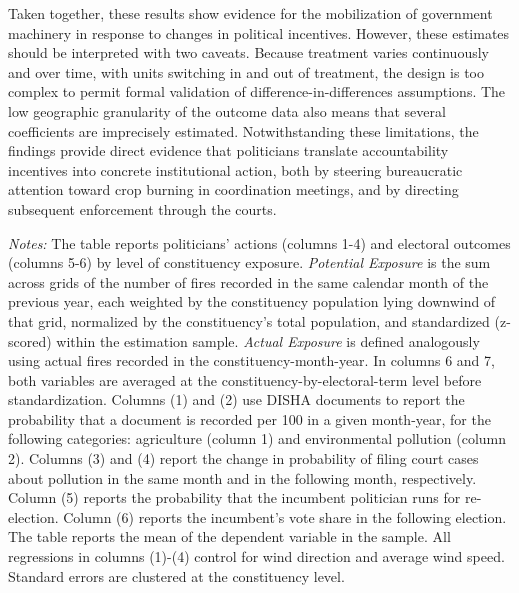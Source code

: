 \documentclass[12pt]{article}
\let\SourceInput
\renewcommand{}[1]{%
  \IfFileExists{../../#1}{\SourceInput{../../#1}}{%
    \IfFileExists{../../#1.tex}{\SourceInput{../../#1.tex}}{%
      \fbox{\scriptsize Missing table: \detokenize{#1}}}}}
\begin{document}
Taken together, these results show evidence for the mobilization of government machinery in response to changes in political incentives. However, these estimates should be interpreted with two caveats. Because treatment varies continuously and over time, with units switching in and out of treatment, the design is too complex to permit formal validation of difference-in-differences assumptions. The low geographic granularity of the outcome data also means that several coefficients are imprecisely estimated. Notwithstanding these limitations, the findings provide direct evidence that politicians translate accountability incentives into concrete institutional action, both by steering bureaucratic attention toward crop burning in coordination meetings, and by directing subsequent enforcement through the courts.


\begin{table}[htbp!] 
\caption{Pollution Exposure, Politicians' Actions, and Electoral Consequences, Count $\times$ Downwind Pop}\label{tab:mechanism}
        \resizebox{\linewidth}{!}{
        
        }
    \begin{minipage}{\textwidth}
        {\footnotesize \textit{Notes:} The table reports politicians' actions (columns 1-4) and electoral outcomes (columns 5-6) by level of constituency exposure.
        \textit{Potential Exposure} is the sum across grids of the number of fires  recorded in the same calendar month of the previous year, each weighted by the  constituency population lying downwind of that grid, normalized by the  constituency's total population, and standardized (z-scored) within the  estimation sample.
       \textit{Actual Exposure} is defined analogously using actual fires recorded in the   constituency-month-year. In columns 6 and 7, both variables are averaged at  the constituency-by-electoral-term level before standardization.
        Columns (1) and (2) use DISHA documents to report the probability that a document is recorded per 100 in a given month-year, for the following categories: agriculture (column 1) and environmental pollution (column 2). Columns (3) and (4) report the change in probability of filing court cases about pollution in the same month and in the following month, respectively. Column (5) reports the probability that the incumbent politician runs for re-election. Column (6) reports the incumbent's vote share in the following election.
        The table reports the mean of the dependent variable in the sample. All regressions in columns (1)-(4) control for wind direction and average wind speed. Standard errors are clustered at the constituency level.
        }
    \end{minipage}
\end{table}
\end{document}

